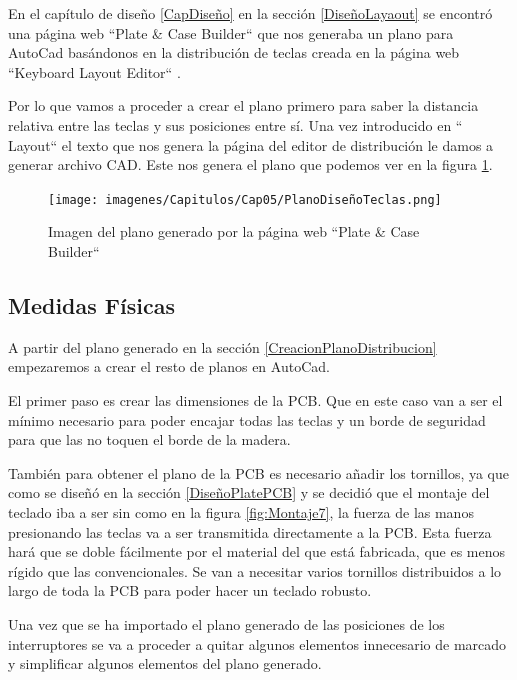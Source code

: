 En el capítulo de diseño \ref{CapDiseño} en la sección \ref{DiseñoLayaout} se encontró una página web ``Plate \& Case Builder`` \cite{builder-swillkb} que nos generaba un plano para AutoCad basándonos en la distribución de teclas creada en la página web ``Keyboard Layout Editor`` \cite{Layout-Editor}.

Por lo que vamos a proceder a crear el plano primero para saber la distancia relativa entre las teclas y sus posiciones entre sí. Una vez introducido en `` Layout`` el texto que nos genera la página del editor de distribución le damos a generar archivo CAD. Este nos genera el plano que podemos ver en la figura \ref{fig:PlanoDistribucionLayout}.

\begin{figure}[H]
    \centering
    \texttt{[image: imagenes/Capitulos/Cap05/PlanoDiseñoTeclas.png]}
    \caption{Imagen del plano generado por la página web ``Plate \& Case Builder`` \cite{builder-swillkb}}
    \label{fig:PlanoDistribucionLayout}
\end{figure}

\subsection{Medidas Físicas} \label{MedidasFisicas}

A partir del plano generado en la sección \ref{CreacionPlanoDistribucion} empezaremos a crear el resto de planos en AutoCad.

El primer paso es crear las dimensiones de la \gls{PCB}. Que en este caso van a ser el mínimo necesario para poder encajar todas las teclas y un borde de seguridad para que las  no toquen el borde de la madera.

También para obtener el plano de la \gls{PCB} es necesario añadir los tornillos, ya que como se diseñó en la sección \ref{DiseñoPlatePCB} y se decidió que el montaje del teclado iba a ser sin  como en la figura \ref{fig:Montaje7}, la fuerza de las manos presionando las teclas va a ser transmitida directamente a la \gls{PCB}. Esta fuerza hará que se doble fácilmente por el material del que está fabricada, que es menos rígido que las  convencionales. Se van a necesitar varios tornillos distribuidos a lo largo de toda la \gls{PCB} para poder hacer un teclado robusto.

Una vez que se ha importado el plano generado de las posiciones de los interruptores se va a proceder a quitar algunos elementos innecesario de marcado y simplificar algunos elementos del plano generado.

